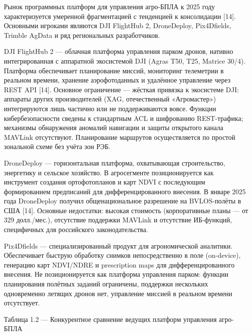 \documentclass[14pt,a4paper]{extarticle}
\begin{document}
Рынок программных платформ для управления агро-БПЛА к 2025 году характеризуется умеренной фрагментацией с тенденцией к консолидации {[}14{]}. Основными игроками являются DJI FlightHub 2, DroneDeploy, Pix4Dfields, Trimble AgData и ряд региональных разработчиков.

DJI FlightHub 2 --- облачная платформа управления парком дронов, нативно интегрированная с аппаратной экосистемой DJI (Agras T50, T25, Matrice 30/4). Платформа обеспечивает планирование миссий, мониторинг телеметрии в реальном времени, хранение аэрофотоданных и удалённое управление через REST API {[}14{]}. Основное ограничение --- жёсткая привязка к экосистеме DJI: аппараты других производителей (XAG, отечественный «Агромастер») интегрируются лишь частично или не поддерживаются вовсе. Функции кибербезопасности сведены к стандартным ACL и шифрованию REST-трафика; механизмы обнаружения аномалий навигации и защиты открытого канала MAVLink отсутствуют. Планирование маршрутов осуществляется по простой зональной схеме без учёта зон РЭБ.

DroneDeploy --- горизонтальная платформа, охватывающая строительство, энергетику и сельское хозяйство. В агросегменте позиционируется как инструмент создания ортофотопланов и карт NDVI с последующим формированием предписаний для дифференцированного внесения. В январе 2025 года DroneDeploy получил общенациональное разрешение на BVLOS-полёты в США {[}14{]}. Основные недостатки: высокая стоимость (корпоративные планы --- от 329 долл./мес.), отсутствие поддержки MAVLink и отсутствие ИБ-функций, специфичных для российского законодательства.

Pix4Dfields --- специализированный продукт для агрономической аналитики. Обеспечивает быструю обработку снимков непосредственно в поле (on-device), генерацию карт NDVI/NDRE и prescription maps для дифференцированного внесения. Не позиционируется как платформа управления парком: функции планирования полётных заданий ограничены, поддержки нескольких одновременно летящих дронов нет, управление миссией в реальном времени отсутствует.

Таблица 1.2 --- Конкурентное сравнение ведущих платформ управления агро-БПЛА
\end{document}
